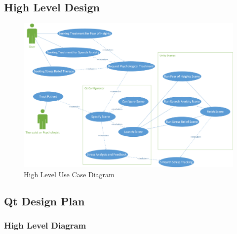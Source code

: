 \documentclass[a4paper,10pt,twoside]{article}
\begin{document}
	\subsection{High Level Design}
		\begin{figure}[H]
			\includegraphics[width=\linewidth,height=\paperheight,keepaspectratio]{highUseCase.png}
			\caption{High Level Use Case Diagram}
			\label{fig:highlevelusecase}
		\end{figure}
	\pagebreak
	\subsection{Qt Design Plan}
		\subsubsection{High Level Diagram}
		\pagebreak
\end{document}
